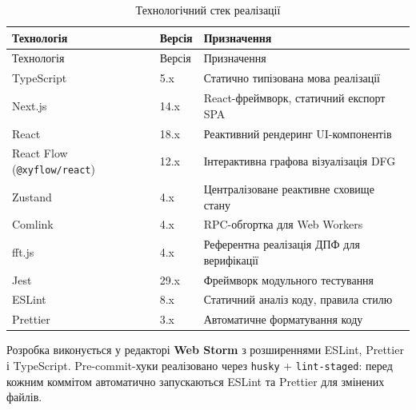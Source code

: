 \documentclass[
]{article}
\begin{document}
\begin{longtable}[]{@{}
  >{\raggedright\arraybackslash}p{}
  >{\raggedright\arraybackslash}p{}
  >{\raggedright\arraybackslash}p{}@{}}
\caption{Технологічний стек реалізації}\tabularnewline
\toprule\noalign{}
\begin{minipage}[b]{\linewidth}\raggedright
Технологія
\end{minipage} & \begin{minipage}[b]{\linewidth}\raggedright
Версія
\end{minipage} & \begin{minipage}[b]{\linewidth}\raggedright
Призначення
\end{minipage} \\
\midrule\noalign{}
\endfirsthead
\toprule\noalign{}
\begin{minipage}[b]{\linewidth}\raggedright
Технологія
\end{minipage} & \begin{minipage}[b]{\linewidth}\raggedright
Версія
\end{minipage} & \begin{minipage}[b]{\linewidth}\raggedright
Призначення
\end{minipage} \\
\midrule\noalign{}
\endhead
\bottomrule\noalign{}
\endlastfoot
TypeScript & 5.x & Статично типізована мова реалізації \\
Next.js & 14.x & React-фреймворк, статичний експорт SPA \\
React & 18.x & Реактивний рендеринг UI-компонентів \\
React Flow (\texttt{@xyflow/react}) & 12.x & Інтерактивна графова
візуалізація DFG \\
Zustand & 4.x & Централізоване реактивне сховище стану \\
Comlink & 4.x & RPC-обгортка для Web Workers \\
fft.js & 4.x & Референтна реалізація ДПФ для верифікації \\
Jest & 29.x & Фреймворк модульного тестування \\
ESLint & 8.x & Статичний аналіз коду, правила стилю \\
Prettier & 3.x & Автоматичне форматування коду \\
\end{longtable}

Розробка виконується у редакторі \textbf{Web Storm} з розширеннями
ESLint, Prettier і TypeScript. Pre-commit-хуки реалізовано через
\texttt{husky} + \texttt{lint-staged}: перед кожним коммітом автоматично
запускаються ESLint та Prettier для змінених файлів.
\end{document}
